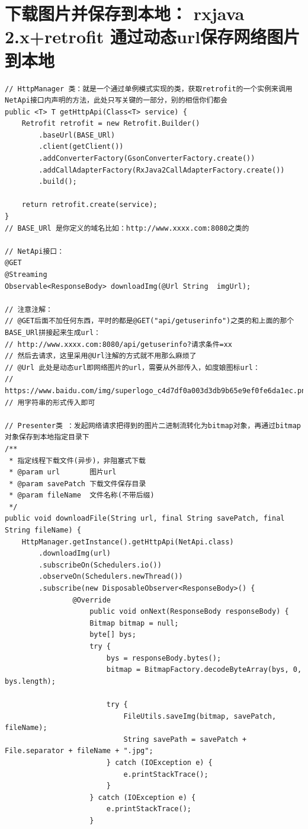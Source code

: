 \documentclass[9pt, b5paper]{article}
\begin{document}
\section{下载图片并保存到本地： rxjava 2.x+retrofit 通过动态url保存网络图片到本地}
\label{sec-8}
\begin{verbatim}
// HttpManager 类：就是一个通过单例模式实现的类，获取retrofit的一个实例来调用NetApi接口内声明的方法，此处只写关键的一部分，别的相信你们都会
public <T> T getHttpApi(Class<T> service) {
    Retrofit retrofit = new Retrofit.Builder()
        .baseUrl(BASE_URl)
        .client(getClient())
        .addConverterFactory(GsonConverterFactory.create())
        .addCallAdapterFactory(RxJava2CallAdapterFactory.create())
        .build();

    return retrofit.create(service);
}
// BASE_URl 是你定义的域名比如：http://www.xxxx.com:8080之类的

// NetApi接口：
@GET
@Streaming
Observable<ResponseBody> downloadImg(@Url String  imgUrl);

// 注意注解：
// @GET后面不加任何东西，平时的都是@GET("api/getuserinfo")之类的和上面的那个BASE_URl拼接起来生成url：
// http://www.xxxx.com:8080/api/getuserinfo?请求条件=xx
// 然后去请求，这里采用@Url注解的方式就不用那么麻烦了
// @Url 此处是动态url即网络图片的url，需要从外部传入，如度娘图标url：
// https://www.baidu.com/img/superlogo_c4d7df0a003d3db9b65e9ef0fe6da1ec.png
// 用字符串的形式传入即可

// Presenter类 ：发起网络请求把得到的图片二进制流转化为bitmap对象，再通过bitmap对象保存到本地指定目录下
/**
 * 指定线程下载文件(异步)，非阻塞式下载
 * @param url       图片url
 * @param savePatch 下载文件保存目录
 * @param fileName  文件名称(不带后缀)
 */
public void downloadFile(String url, final String savePatch, final String fileName) {
    HttpManager.getInstance().getHttpApi(NetApi.class)
        .downloadImg(url)
        .subscribeOn(Schedulers.io())
        .observeOn(Schedulers.newThread())
        .subscribe(new DisposableObserver<ResponseBody>() {
                @Override
                    public void onNext(ResponseBody responseBody) {
                    Bitmap bitmap = null;
                    byte[] bys;
                    try {
                        bys = responseBody.bytes();
                        bitmap = BitmapFactory.decodeByteArray(bys, 0, bys.length);

                        try {
                            FileUtils.saveImg(bitmap, savePatch, fileName);
                            String savePath = savePatch + File.separator + fileName + ".jpg";
                        } catch (IOException e) {
                            e.printStackTrace();
                        }
                    } catch (IOException e) {
                        e.printStackTrace();
                    }


\end{verbatim}
\end{document}
